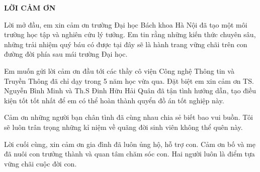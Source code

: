 \documentclass[../DoAn.tex]{subfiles}
\begin{document}
\begin{center}
    \Large{\textbf{LỜI CẢM ƠN}}\\
\end{center}
\vspace{1cm}
Lời mở đầu, em xin cảm ơn trường Đại học Bách khoa Hà Nội đã tạo một môi trường học tập và nghiên cứu lý tưởng. Em tin rằng những kiến thức chuyên sâu, những trải nhiệm quý báu có được tại đây sẽ là hành trang vững chãi trên con đường đời phía sau mái trường Đại học.

Em muốn gửi lời cảm ơn đầu tới các thầy cô viện Công nghệ Thông tin và Truyền Thông đã chỉ dạy trong 5 năm học vừa qua. Đặt biệt em xin cảm ơn TS. Nguyễn Bình Minh và Th.S Đinh Hữu Hải Quân đã tận tình hướng dẫn, tạo điều kiện tốt tốt nhất để em có thể hoàn thành quyển đồ án tốt nghiệp này.

Cảm ơn những người bạn chân tình đã cùng nhau chia sẻ biết bao vui buồn. Tôi sẽ luôn trân trọng những kỉ niệm về quãng đời sinh viên không thể quên này.

Lời cuối cùng, xin cảm ơn gia đình đã luôn ủng hộ, hỗ trợ con. Cảm ơn bố và mẹ đã nuôi con trưởng thành và quan tâm chăm sóc con. Hai người luôn là điểm tựa vững chãi cuộc đời con.
\end{document}
